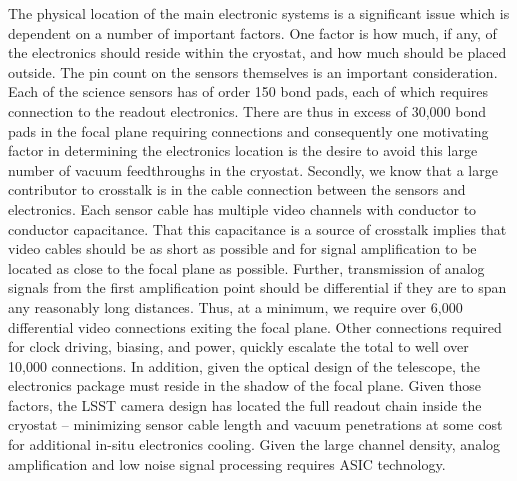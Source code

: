 The physical location of the main electronic systems is a significant issue which is dependent on a number of important factors. One factor is how much, if any, of the electronics should reside within the cryostat, and how much should be placed outside. 
The pin count on the sensors themselves is an important consideration. Each of the science sensors has of order 150 bond pads, each of which requires connection to the readout electronics. There are thus in excess of 30,000 bond pads in the focal plane requiring connections and consequently one motivating factor in determining the electronics location is the desire to avoid this large number of vacuum feedthroughs in the cryostat. Secondly, we know that a large contributor to crosstalk is in the cable connection between the sensors and electronics. Each sensor cable has multiple video channels with conductor to conductor capacitance. That this capacitance is a source of crosstalk implies that video cables should be as short as possible and for signal amplification to be located as close to the focal plane as possible. Further, transmission of analog signals from the first amplification point should be differential if they are to span any reasonably long distances. Thus, at a minimum, we require over 6,000 differential video connections exiting the focal plane. 
Other connections required for clock driving, biasing, and power, quickly escalate the total to well over 10,000 connections. In addition, given the optical design of the telescope, the electronics package must reside in the shadow of the focal plane. Given those factors, the LSST camera design has located the full readout chain inside the cryostat – minimizing sensor cable length and vacuum penetrations at some cost for additional in-situ electronics cooling. Given the large channel density, analog amplification and low noise signal processing requires ASIC technology. 

